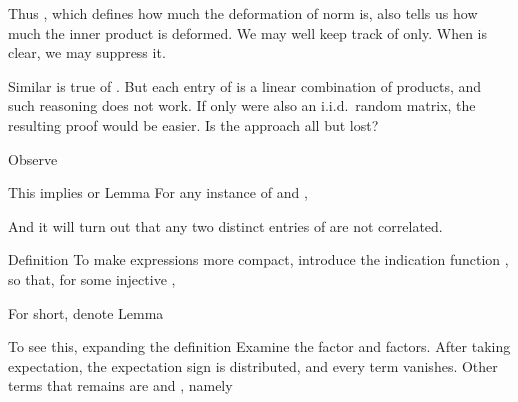 Thus , which defines how much the deformation of norm is, also tells us how much the inner product is deformed.
We may well keep track of  only.
When  is clear, we may suppress it.

Similar is true of .
But each entry of  is a linear combination of products, and such reasoning does not work.
If only  were also an i.i.d.\ random matrix, the resulting proof would be easier.
Is the approach all but lost?

Observe

This implies
or
\Result
{Lemma}
{
For any instance of  and ,
}

And it will turn out that any two distinct entries of  are not correlated.

\Result
{Definition}
{
To make expressions more compact, introduce the indication function \m {\i}, so that, for some injective ,
}

For short, denote
\Result
{Lemma}
{
}

To see this, expanding the definition
Examine the  factor and  factors.
After taking expectation, the expectation sign is distributed, and every term vanishes.
Other terms that remains are  and , namely

